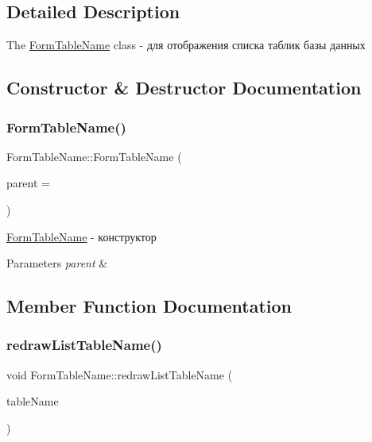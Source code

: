 \subsection{Detailed Description}
The \hyperlink{classFormTableName}{Form\+Table\+Name} class -\/ для отображения списка таблик базы данных 

\subsection{Constructor \& Destructor Documentation}
\mbox{\label{classFormTableName_afa68894f6031e57f82166a2941023331}} 
\subsubsection{\texorpdfstring{Form\+Table\+Name()}{FormTableName()}}
{\footnotesize\ttfamily Form\+Table\+Name\+::\+Form\+Table\+Name (\begin{DoxyParamCaption}\item[{Q\+Widget $\ast$}]{parent = {} }\end{DoxyParamCaption})\hspace{0.3cm}{\ttfamily [explicit]}}



\hyperlink{classFormTableName}{Form\+Table\+Name} -\/ конструктор 


\begin{DoxyParams}{Parameters}
{\em parent} & \\
\hline
\end{DoxyParams}


\subsection{Member Function Documentation}
\mbox{\label{classFormTableName_aa39e5e39a27e2c2e1d9bd0dba1d42a93}} 
\subsubsection{\texorpdfstring{redraw\+List\+Table\+Name()}{redrawListTableName()}}
{\footnotesize\ttfamily void Form\+Table\+Name\+::redraw\+List\+Table\+Name (\begin{DoxyParamCaption}\item[{const Q\+String\+List \&}]{table\+Name }\end{DoxyParamCaption})}




